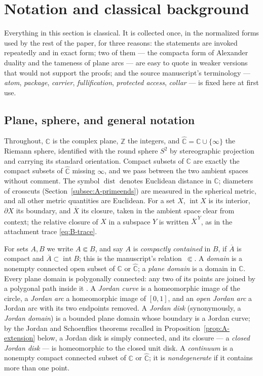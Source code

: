 \documentclass[11pt,reqno]{amsart}
\theoremstyle{definition}
\theoremstyle{remark}
\newcommand{\C}{\mathbb C}
\newcommand{\Z}{\mathbb Z}
\newcommand{\Chat}{\widehat{\mathbb C}}
\newcommand{\Int}{\operatorname{int}}
\newcommand{\dist}{\operatorname{dist}}
\begin{document}

\section{Notation and classical background}\label{sec:prelim}

Everything in this section is classical.  It is collected once, in the
normalized forms used by the rest of the paper, for three reasons: the
statements are invoked repeatedly and in exact form; two of them --- the
compacta form of Alexander duality and the tameness of plane arcs --- are
easy to quote in weaker versions that would not support the proofs; and the
source manuscript's terminology --- \emph{atom}, \emph{package},
\emph{carrier}, \emph{fullification}, \emph{protected access},
\emph{collar} --- is fixed here at first use.

\subsection{Plane, sphere, and general notation}\label{subsec:A-notation}

Throughout, $\C$ is the complex plane, $\Z$ the integers, and
$\Chat=\C\cup\{\infty\}$ the Riemann sphere, identified with the round
sphere $S^2$ by stereographic projection and carrying its standard
orientation.  Compact subsets of $\C$ are exactly the compact subsets of
$\Chat$ missing $\infty$, and we pass between the two ambient spaces
without comment.  The symbol $\dist$ denotes Euclidean distance in $\C$;
diameters of crosscuts (Section~\ref{subsec:A-primeends}) are measured in
the spherical metric, and all other metric quantities are Euclidean.  For
a set $X$, $\Int X$ is its interior, $\partial X$ its boundary, and
$\overline{X}$ its closure, taken in the ambient space clear from context;
the relative closure of $X$ in a subspace $Y$ is written
$\overline{X}^{\,Y}$, as in the attachment trace \eqref{eq:B-trace}.

For sets $A,B$ we write $A\Subset B$, and say $A$ is \emph{compactly
contained} in $B$, if $\overline{A}$ is compact and
$\overline{A}\subset\Int B$; this is the manuscript's relation~$\Subset$.
A \emph{domain} is a nonempty connected open subset of $\C$ or $\Chat$; a
\emph{plane domain} is a domain in $\C$.  Every plane domain is polygonally
connected: any two of its points are joined by a polygonal path inside it
\cite{New51}.  A \emph{Jordan curve} is a homeomorphic image of the circle,
a \emph{Jordan arc} a homeomorphic image of $[0,1]$, and an \emph{open
Jordan arc} a Jordan arc with its two endpoints removed.  A \emph{Jordan
disk} (synonymously, a \emph{Jordan domain}) is a bounded plane domain
whose boundary is a Jordan curve; by the Jordan and Schoenflies theorems
recalled in Proposition~\ref{prop:A-extension} below, a Jordan disk is
simply connected, and its closure --- a \emph{closed Jordan disk} --- is
homeomorphic to the closed unit disk.  A \emph{continuum} is a nonempty
compact connected subset of $\C$ or $\Chat$; it is \emph{nondegenerate} if
it contains more than one point.
\end{document}
